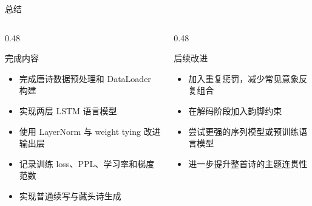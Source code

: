\documentclass[aspectratio=169,10pt]{ctexbeamer}
\begin{document}
\begin{frame}{总结}
	\begin{columns}[T,onlytextwidth]
		\begin{column}{0.48\textwidth}
			\begin{block}{完成内容}
				\begin{itemize}
					\item 完成唐诗数据预处理和 DataLoader 构建
					\item 实现两层 LSTM 语言模型
					\item 使用 LayerNorm 与 weight tying 改进输出层
					\item 记录训练 loss、PPL、学习率和梯度范数
					\item 实现普通续写与藏头诗生成
				\end{itemize}
			\end{block}
		\end{column}
		\begin{column}{0.48\textwidth}
			\begin{block}{后续改进}
				\begin{itemize}
					\item 加入重复惩罚，减少常见意象反复组合
					\item 在解码阶段加入韵脚约束
					\item 尝试更强的序列模型或预训练语言模型
					\item 进一步提升整首诗的主题连贯性
				\end{itemize}
			\end{block}
		\end{column}
	\end{columns}
\end{frame}
\end{document}
